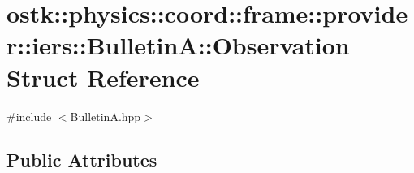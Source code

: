 \hypertarget{structostk_1_1physics_1_1coord_1_1frame_1_1provider_1_1iers_1_1_bulletin_a_1_1_observation}{}\section{ostk\+:\+:physics\+:\+:coord\+:\+:frame\+:\+:provider\+:\+:iers\+:\+:BulletinA\+:\+:Observation Struct Reference}
\label{structostk_1_1physics_1_1coord_1_1frame_1_1provider_1_1iers_1_1_bulletin_a_1_1_observation}


{\ttfamily \#include $<$Bulletin\+A.\+hpp$>$}

\subsection*{Public Attributes}

